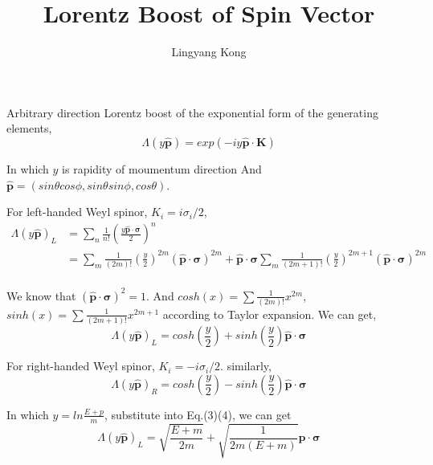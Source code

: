 \documentclass[a4paper]{article}
\title{\textbf{Lorentz Boost of Spin Vector}}
\author{Lingyang Kong}
\date{}
\begin{document}
\maketitle
\par Arbitrary direction Lorentz boost of the exponential form of the generating elements,
\begin{equation}
    \Lambda(y\hat{\boldsymbol{p}})=exp(-iy\hat{\boldsymbol{p}}\cdot\boldsymbol{K})
\end{equation}
\par In which $y$ is rapidity of moumentum direction And $\hat{\boldsymbol{p}}=(sin\theta cos\phi, sin\theta sin\phi, cos\theta)$.
\par For left-handed Weyl spinor, $K_{i}=i\sigma_{i}/2$, 
\begin{equation}
    \begin{split}
            \Lambda(y\hat{\boldsymbol{p}})_{L}
            &=\sum_{n}{\frac{1}{n!}(\frac{y\hat{\boldsymbol{p}}\cdot \boldsymbol{\sigma}}{2})^n}\\
            &=\sum_{m}{\frac{1}{(2m)!}(\frac{y}{2})^{2m}(\hat{\boldsymbol{p}}\cdot \boldsymbol{\sigma})^{2m}}
            +\hat{\boldsymbol{p}}\cdot \boldsymbol{\sigma}\sum_{m}{\frac{1}{(2m+1)!}(\frac{y}{2})^{2m+1}(\hat{\boldsymbol{p}}\cdot \boldsymbol{\sigma})^{2m}}\\
    \end{split}
\end{equation}
\par We know that $(\hat{\boldsymbol{p}}\cdot \boldsymbol{\sigma})^2=1$. And $cosh(x)=\sum{\frac{1}{(2m)!}x^{2m}}$, $sinh(x)=\sum{\frac{1}{(2m+1)!}x^{2m+1}}$ according to Taylor expansion. We can get,
\begin{equation}
    \Lambda(y\hat{\boldsymbol{p}})_{L}=cosh(\frac{y}{2})+sinh(\frac{y}{2})\hat{\boldsymbol{p}}\cdot \boldsymbol{\sigma}
\end{equation}
\par For right-handed Weyl spinor, $K_{i}=-i\sigma_{i}/2$. similarly,
\begin{equation}
    \Lambda(y\hat{\boldsymbol{p}})_{R}=cosh(\frac{y}{2})-sinh(\frac{y}{2})\hat{\boldsymbol{p}}\cdot \boldsymbol{\sigma}
\end{equation}
\par In which $y=ln\frac{E+p}{m}$, substitute into Eq.(3)(4), we can get
\begin{equation}
    \Lambda(y\hat{\boldsymbol{p}})_{L}=\sqrt{\frac{E+m}{2m}}+\sqrt{\frac{1}{2m(E+m)}}\boldsymbol{p}\cdot\boldsymbol{\sigma}
\end{equation}
\end{document}
